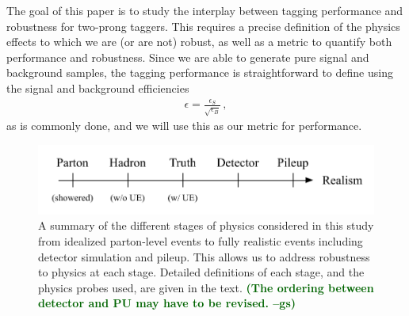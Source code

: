 \documentclass[11pt,letterpaper]{article}
\newcommand{\gs}[1]{\textbf{\textcolor{darkgreen}{(#1 --gs)}}}
\begin{document}
The goal of this paper is to study the interplay between tagging performance and robustness for two-prong taggers.
%
This requires a precise definition of the physics effects to which we are (or are not) robust, as well as a metric to quantify both performance and robustness.
%
Since we are able to generate pure signal and background samples, the tagging performance is straightforward to define using the signal and background efficiencies 
\begin{align}
\epsilon=\frac{\epsilon_S}{\sqrt{\epsilon_B}}\,,
\end{align}
as is commonly done, and we will use this as our metric for performance.

\begin{figure}[t]
\begin{center}
\includegraphics[width=0.75\columnwidth]{figures/realism_levels}
\end{center}
\caption{A summary of the different stages of physics considered in
  this study from idealized parton-level events to fully realistic
  events including detector simulation and pileup.
  This allows us to
  address robustness to physics at each stage.
  Detailed definitions of
  each stage, and the physics probes used, are given in the text.
  \gs{The
    ordering between detector and PU may have to be revised.} }
\label{fig:realism}
\end{figure}
\end{document}
